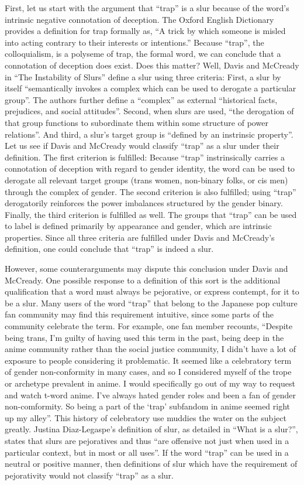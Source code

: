 \documentclass[12pt, letterpaper]{article}
\begin{document}
\begin{mla}
First, let us start with the argument that ``trap'' is a slur because of the
word's intrinsic negative connotation of deception. The Oxford English
Dictionary provides a definition for trap formally as, ``A trick by which
someone is misled into acting contrary to their interests or intentions.''
Because ``trap'', the colloquialism, is a polyseme of trap, the formal word,
we can conclude that a connotation of deception does exist. Does this matter?
Well, Davis and McCready in ``The Instability of Slurs'' define a slur using
three criteria: First, a slur by itself ``semantically invokes a complex which
can be used to derogate a particular group''. The authors further define a
``complex'' as external ``historical facts, prejudices, and social
attitudes''. Second, when slurs are used, ``the derogation of that group
functions to subordinate them within some structure of power relations''.
And third, a slur's target group is ``defined by an instrinsic property''.
Let us see if Davis and McCready would classify ``trap'' as a slur under their
definition. The first criterion is fulfilled: Because ``trap'' instrinsically
carries a connotation of deception with regard to gender identity, the word
can be used to derogate all relevant target groups (trans women, non-binary
folks, or cis men) through the complex of gender. The second criterion is also
fulfilled; using ``trap'' derogatorily reinforces the power imbalances
structured by the gender binary. Finally, the third criterion is fulfilled as
well. The groups that ``trap'' can be used to label is defined primarily by
appearance and gender, which are intrinsic properties. Since all three
criteria are fulfilled under Davis and McCready's definition, one could
conclude that ``trap'' is indeed a slur.

However, some counterarguments may dispute this conclusion under Davis and
McCready. One possible response to a definition of this sort is the additional
qualification that a word must always be pejorative, or express contempt, for
it to be a slur. Many users of the word ``trap'' that belong to the Japanese
pop culture fan community may find this requirement intuitive, since some
parts of the community celebrate the term. For example, one fan member
recounts, ``Despite being trans, I'm guilty of having used this term in the
past, being deep in the anime community rather than the social justice
community, I didn't have a lot of exposure to people considering it
problematic. It seemed like a celebratory term of gender non-conformity in
many cases, and so I considered myself of the trope or archetype prevalent in
anime. I would specifically go out of my way to request and watch t-word
anime. I've always hated gender roles and been a fan of gender non-comformity.
So being a part of the `trap' subfandom in anime seemed right up my alley''.
This history of celebratory use muddies the water on the subject greatly.
Justina Diaz-Legaspe's definition of slur, as detailed in ``What is a slur?'',
states that slurs are pejoratives and thus ``are offensive not just when used
in a particular context, but in most or all uses''. If the word ``trap'' can
be used in a neutral or positive manner, then definitions of slur which have
the requirement of pejorativity would not classify ``trap'' as a slur.


\end{mla}
\end{document}
